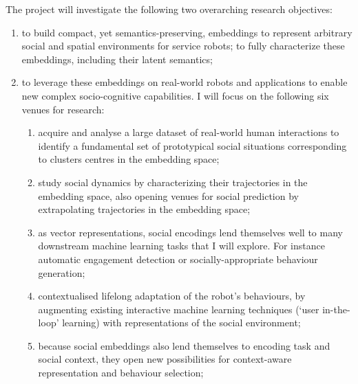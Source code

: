 \vspace{0.4em}

\noindent The \project project will investigate the following
two overarching research objectives:

\begin{enumerate}
        \item to build compact, yet semantics-preserving, embeddings to
            represent arbitrary social and spatial environments for service
            robots; to fully characterize these embeddings, including their
            latent semantics;

        \item to leverage these embeddings on real-world robots and
            applications to enable new complex socio-cognitive capabilities. I
            will focus on the following six venues for research:

            \begin{enumerate}
                \item acquire and analyse a large dataset of real-world human
                    interactions to identify a fundamental set of prototypical
                    social situations corresponding to clusters centres in the
                    embedding space;

                \item study social dynamics by characterizing their trajectories
                    in the embedding space, also opening venues for social
                    prediction by extrapolating trajectories in the embedding
                    space;

                \item as vector representations, social encodings lend
                    themselves well to many downstream machine learning tasks
                    that I will explore. For instance automatic engagement
                    detection or socially-appropriate behaviour generation;

                \item contextualised lifelong adaptation of the robot's
                    behaviours, by augmenting existing interactive machine
                    learning techniques (`user in-the-loop' learning) with
                    representations of the social environment;

                \item because social embeddings also lend themselves to encoding
                    task and social context, they open new possibilities for
                    context-aware representation and behaviour selection;


\end{enumerate}
\end{enumerate}
